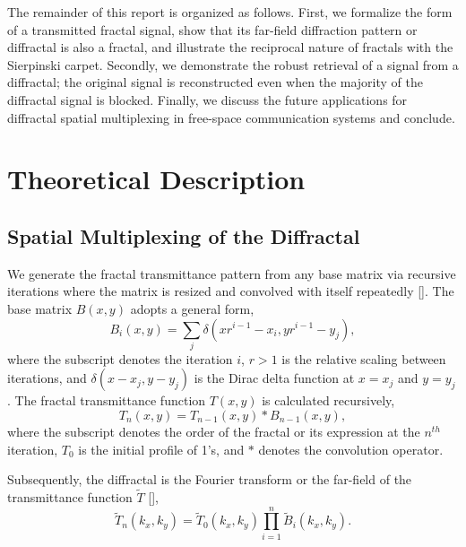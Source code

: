 The remainder of this report is organized as follows.  First, we formalize the form of a transmitted fractal signal, show that its far-field diffraction pattern or diffractal is also a fractal, and illustrate the reciprocal nature of fractals with the Sierpinski carpet. Secondly, we demonstrate the robust retrieval of a signal from a diffractal; the original signal is reconstructed even when the majority of the diffractal signal is blocked. Finally, we discuss the future applications for diffractal spatial multiplexing in free-space communication systems and conclude. 

\section{Theoretical Description}\label{theory} 
\subsection{Spatial Multiplexing of the Diffractal} 

We generate the fractal transmittance pattern from any base matrix via recursive iterations where the matrix is resized and convolved with itself repeatedly [\cite{Allouche}].  The base matrix $B(x,y)$ adopts a general form,
\begin{equation}
B_i(x,y) = \sum_j\delta(xr^{i-1}-x_i,yr^{i-1}-y_j),
\label{BJ1}
\end{equation}
where the subscript denotes the iteration $i$, $r>1$ is the relative scaling between iterations, and $\delta(x-x_j,y-y_j)$ is the Dirac delta function at $x = x_j$ and $y=y_j$. 
The fractal transmittance function $T(x,y)$ is calculated recursively,
\begin{equation}
T_n(x,y) = T_{n-1}(x,y)*B_{n-1}(x,y),
\label{nTrans}
\end{equation}
where the subscript denotes the order of the fractal or its expression at the $n^{th}$ iteration, $T_0$ is the initial profile of 1's, and $*$ denotes the convolution operator.  

Subsequently, the diffractal is the Fourier transform or the far-field of the transmittance function $\tilde{T}$ [\cite{Horvath}],
\begin{equation}
\tilde{T}_n(k_x,k_y) = \tilde{T}_0(k_x,k_y)\prod_{i=1}^{n}\tilde{B}_i(k_x,k_y)\label{FTn}.
\end{equation}

